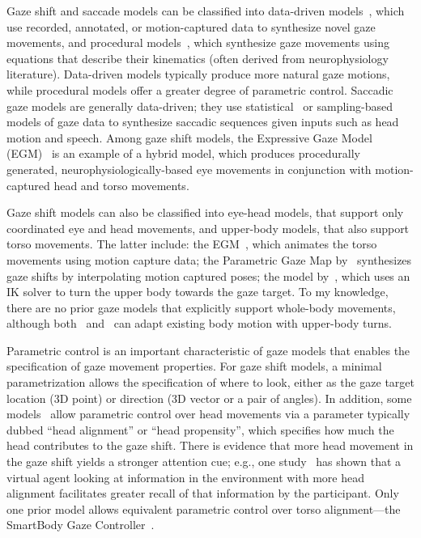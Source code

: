 Gaze shift and saccade models can be classified into data-driven models~\cite{heck2007automated,lance2010expressive,lee2002eyes,deng2005automated,ma2009natural,le2012live}, which use recorded, annotated, or motion-captured data to synthesize novel gaze movements, and procedural models~\cite{peters2010animating,thiebaux2009realtime}, which synthesize gaze movements using equations that describe their kinematics (often derived from neurophysiology literature). Data-driven models typically produce more natural gaze motions, while procedural models offer a greater degree of parametric control. Saccadic gaze models are generally data-driven; they use statistical~\cite{lee2002eyes,ma2009natural,le2012live} or sampling-based~\cite{deng2005automated} models of gaze data to synthesize saccadic sequences given inputs such as head motion and speech. Among gaze shift models, the Expressive Gaze Model (EGM)~\cite{lance2010expressive} is an example of a hybrid model, which produces procedurally generated, neurophysiologically-based eye movements in conjunction with motion-captured head and torso movements.

Gaze shift models can also be classified into eye-head models, that support only coordinated eye and head movements, and upper-body models, that also support torso movements. The latter include: the EGM~\cite{lance2010expressive}, which animates the torso movements using motion capture data; the Parametric Gaze Map by~\citet{heck2007automated} synthesizes gaze shifts by interpolating motion captured poses; the model by~\citet{grillon2009crowds}, which uses an IK solver to turn the upper body towards the gaze target. To my knowledge, there are no prior gaze models that explicitly support whole-body movements, although both~\cite{heck2007automated} and~\cite{grillon2009crowds} can adapt existing body motion with upper-body turns.

Parametric control is an important characteristic of gaze models that enables the specification of gaze movement properties. For gaze shift models, a minimal parametrization allows the specification of where to look, either as the gaze target location (3D point) or direction (3D vector or a pair of angles). In addition, some models~\cite{peters2010animating,lance2010expressive,thiebaux2009realtime} allow parametric control over head movements via a parameter typically dubbed ``head alignment'' or ``head propensity'', which specifies how much the head contributes to the gaze shift. There is evidence that more head movement in the gaze shift yields a stronger attention cue; e.g., one study~\cite{andrist2012designing} has shown that a virtual agent looking at information in the environment with more head alignment facilitates greater recall of that information by the participant. Only one prior model allows equivalent parametric control over torso alignment---the SmartBody Gaze Controller~\cite{thiebaux2009realtime}.

